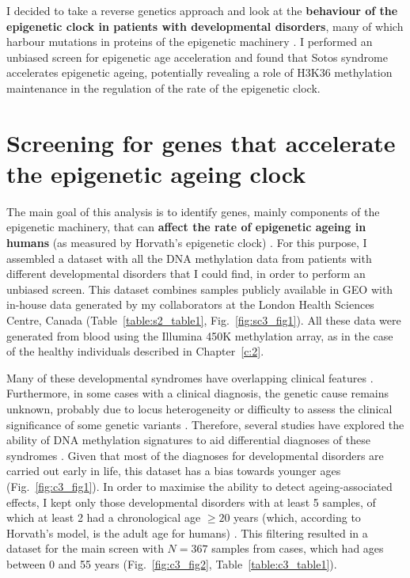 \bigskip

I decided to take a reverse genetics approach and look at the \textbf{behaviour of the epigenetic clock in patients with developmental disorders}, many of which harbour mutations in proteins of the epigenetic machinery \citep{Aref-Eshghi2018,Bjornsson2015}. I performed an unbiased screen for epigenetic age acceleration and found that Sotos syndrome accelerates epigenetic ageing, potentially revealing a role of H3K36 methylation maintenance in the regulation of the rate of the epigenetic clock.

\smallskip

\section{Screening for genes that accelerate the epigenetic ageing clock} \label{s:3.2}

\smallskip

The main goal of this analysis is to identify genes, mainly components of the epigenetic machinery, that can \textbf{affect the rate of epigenetic ageing in humans} (as measured by Horvath’s epigenetic clock) \citep{Horvath2013}. For this purpose, I assembled a dataset with all the DNA methylation data from patients with different developmental disorders that I could find, in order to perform an unbiased screen. This dataset combines samples publicly available in GEO \citep{Edgar2002} with in-house data generated by my collaborators at the London Health Sciences Centre, Canada (Table~\ref{table:s2_table1}, Fig.~\ref{fig:sc3_fig1}). All these data were generated from blood using the Illumina 450K methylation array, as in the case of the healthy individuals described in Chapter~\ref{c:2}.   

\bigskip

Many of these developmental syndromes have overlapping clinical features \citep{Aref-Eshghi2018, Bjornsson2015}. Furthermore, in some cases with a clinical diagnosis, the genetic cause remains unknown, probably due to locus heterogeneity or difficulty to assess the clinical significance of some genetic variants \citep{Aref-Eshghi2017}. Therefore, several studies have explored the ability of DNA methylation signatures to aid differential diagnoses of these syndromes \citep{Aref-Eshghi2018,Aref-Eshghi2017,Aref-Eshghi2018a,Butcher2017,Choufani2015,Schenkel2016,Alisch2013,Schenkel2017,Hood2016,Aldinger2013,Grafodatskaya2013,Kernohan2016}. Given that most of the diagnoses for developmental disorders are carried out early in life, this dataset has a bias towards younger ages (Fig.~\ref{fig:c3_fig1}). In order to maximise the ability to detect ageing-associated effects, I kept only those developmental disorders with at least 5 samples, of which at least 2 had a chronological age $\geq 20$ years (which, according to Horvath's model, is the adult age for humans) \citep{Horvath2013}. This filtering resulted in a dataset for the main screen with $N = 367$ samples from cases, which had ages between 0 and 55 years (Fig.~\ref{fig:c3_fig2}, Table~\ref{table:c3_table1}).

